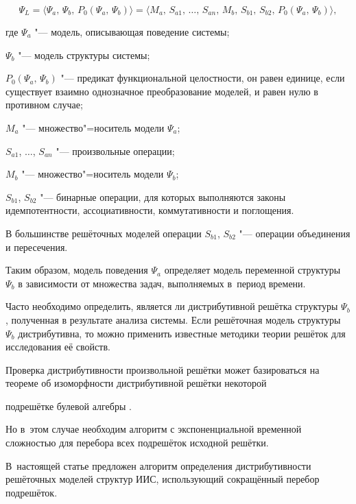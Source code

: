 \[

\Psi_L =\langle \Psi _a,\,\Psi _b ,\,P_0 (\Psi_a,\,\Psi _b )

\rangle =\langle M_a ,\,S_{a1},\,\ldots,\,S_{an},\,M_b

,\,S_{b1},\,S_{b2},\,P_0 ( \Psi_a,\,\Psi _b)\rangle,

\]

где $\Psi _a $ "--- модель, описывающая поведение системы; 

$\Psi _b $ "--- модель структуры системы; 

$P_0(\Psi_a,\,\Psi _b)$ "--- предикат функциональной целостности,  он равен единице, если существует взаимно однозначное преобразование моделей, и равен нулю в противном случае; 

$M_a$ "--- множество"=носитель модели $\Psi_a$; 

$S_{a1}$, $\ldots$, $S_{an}$ "--- произвольные операции;

$M_b$ "--- множество"=носитель модели $\Psi _b $; 

$S_{b1}$, $S_{b2} $ "--- бинарные операции, для которых выполняются законы идемпотентности, ассоциативности, коммутативности и поглощения.



В большинстве решёточных моделей операции $S_{b1}$, $S_{b2}$ "--- операции объединения и пересечения.



Таким образом, модель поведения $\Psi _a $ определяет модель переменной структуры $\Psi _b $ в зависимости от множества задач, выполняемых в~период времени.



Часто необходимо определить, является ли дистрибутивной решётка структуры $\Psi _b $, полученная в результате анализа системы. Если решёточная модель структуры $\Psi _b $ дистрибутивна, то можно применить известные методики теории решёток для исследования её свойств.



Проверка дистрибутивности произвольной решётки может базироваться на теореме об изоморфности дистрибутивной решётки некоторой

подрешётке булевой алгебры \cite{orlov:bib3}. 

Но в~этом случае необходим алгоритм с экспоненциальной временной сложностью для перебора всех подрешёток исходной решётки.



В~настоящей статье предложен алгоритм определения дистрибутивности решёточных моделей структур ИИС, использующий сокращённый перебор подрешёток.







